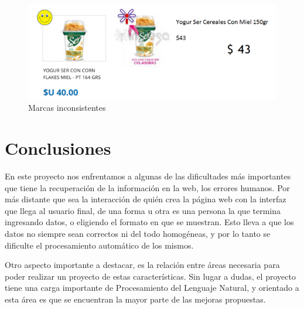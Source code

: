 \documentclass[12pt]{article} %
\begin{document}
\begin{figure}[H]
\includegraphics[scale=1]{problema-etiqueta}
\centering
\caption{Marcas inconsistentes}
\end{figure}


\section{Conclusiones}

En este proyecto nos enfrentamos a algunas de las dificultades más importantes que tiene la recuperación de la información en la web, los errores humanos. Por más distante que sea la interacción de quién crea la página web con la interfaz que llega al usuario final, de una forma u otra es una persona la que termina ingresando datos, o eligiendo el formato en que se muestran. Esto lleva a que los datos no siempre sean correctos ni del todo homogéneas, y por lo tanto se dificulte el procesamiento automático de los mismos.

Otro aspecto importante a destacar, es la relación entre áreas necesaria para poder realizar un proyecto de estas características. Sin lugar a dudas, el proyecto tiene una carga importante de Procesamiento del Lenguaje Natural, y orientado a esta área es que se encuentran la mayor parte de las mejoras propuestas.


\newpage
\end{document}
